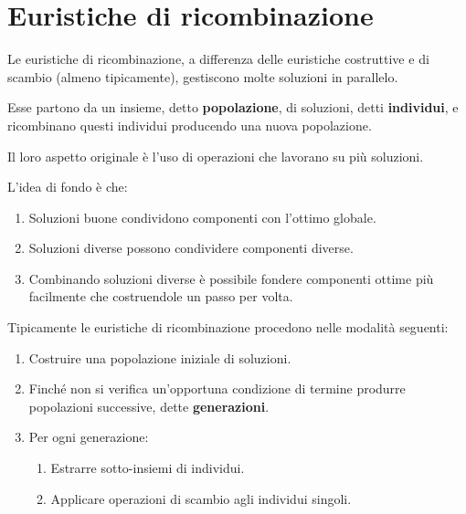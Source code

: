 \documentclass[\main/main.tex]{subfiles}
\begin{document}
\chapter{Euristiche di ricombinazione}
\begin{multicols}{2}
\begin{definition}
    Le euristiche di ricombinazione, a differenza delle euristiche costruttive e di scambio (almeno tipicamente), gestiscono molte soluzioni in parallelo.
    
    Esse partono da un insieme, detto \textbf{popolazione}, di soluzioni, detti \textbf{individui}, e ricombinano questi individui producendo una nuova popolazione.
\end{definition}
\begin{observation}
    Il loro aspetto originale è l'uso di operazioni che lavorano su più soluzioni.
\end{observation}
\begin{observation}
    L'idea di fondo è che:
    \begin{enumerate}
        \item Soluzioni buone condividono componenti con l'ottimo globale.
        \item Soluzioni diverse possono condividere componenti diverse.
        \item Combinando soluzioni diverse è possibile fondere componenti ottime più facilmente che costruendole un passo per volta.
    \end{enumerate}
\end{observation}
\begin{observation}
    Tipicamente le euristiche di ricombinazione procedono nelle modalità seguenti:
    \begin{enumerate}
        \item Costruire una popolazione iniziale di soluzioni.
        \item Finché non si verifica un'opportuna condizione di termine produrre popolazioni successive, dette \textbf{generazioni}.
        \item Per ogni generazione:
        \begin{enumerate}
            \item Estrarre sotto-insiemi di individui.
            \item Applicare operazioni di scambio agli individui singoli.

\end{enumerate}
\end{enumerate}
\end{observation}
\end{multicols}
\end{document}
